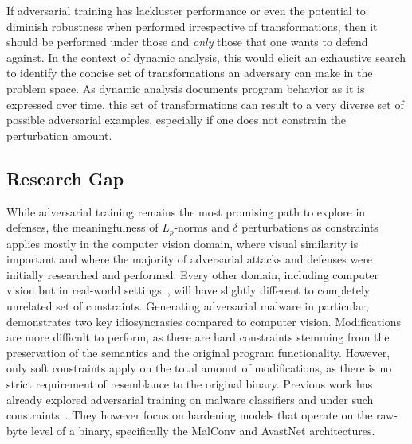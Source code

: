 If adversarial training has lackluster performance or even the potential to diminish robustness when performed irrespective of transformations, then it should be performed under those and \textit{only} those that one wants to defend against.
In the context of dynamic analysis, this would elicit an exhaustive search to identify the concise set of transformations an adversary can make in the problem space.
As dynamic analysis documents program behavior as it is expressed over time, this set of transformations can result to a very diverse set of possible adversarial examples, especially if one does not constrain the perturbation amount.

\subsection{Research Gap}
While adversarial training remains the most promising path to explore in defenses, the meaningfulness of $L_p$-norms and $\delta$ perturbations as constraints applies mostly in the computer vision domain, where visual similarity is important and where the majority of adversarial attacks and defenses were initially researched and performed.
Every other domain, including computer vision but in real-world settings~\cite{sharif2019general}, will have slightly different to completely unrelated set of constraints.
Generating adversarial malware in particular, demonstrates two key idiosyncrasies compared to computer vision.
Modifications are more difficult to perform, as there are hard constraints stemming from the preservation of the semantics and the original program functionality.
However, only soft constraints apply on the total amount of modifications, as there is no strict requirement of resemblance to the original binary.
Previous work has already explored adversarial training on malware classifiers and under such constraints~\cite{lucas2023adversarial}.
They however focus on hardening models that operate on the raw-byte level of a binary, specifically the MalConv and AvastNet architectures.

